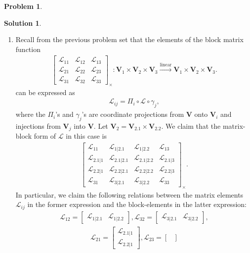 \documentclass{book}
\theoremstyle{definition}
\newtheorem*{prob*}{Problem}
\newtheorem*{sln*}{Solution}
\newcommand{\V}{\mathbf{V}}
\newcommand{\lag}{\mathcal{L}}
\newcommand{\lin}{\overset{\text{linear}}{\longrightarrow}}
\begin{document}
\begin{prob*}
\begin{sln*}
	$\,$
	\begin{enumerate}
		\item Recall from the previous problem set that the elements of the block matrix function 
		\begin{align*}
		\begin{bmatrix}
		\lag_{11} & \lag_{12} & \lag_{13}\\
		\lag_{21} & \lag_{22} & \lag_{23}\\
		\lag_{31} & \lag_{32} & \lag_{33}
		\end{bmatrix}_\times : \V_1\times \V_2 \times \V_3 \lin \V_1\times \V_2\times \V_3.
		\end{align*}
		can be expressed as
		\begin{align*}
		\lag_{ij} = \Pi_i \circ \lag \circ \gamma_j,
		\end{align*}
		where the $\Pi_i$'s and $\gamma_j$'s are coordinate projections from $\V$ onto $\V_i$ and injections from $\V_j$ into $\V$. Let $\V_2 = \V_{2.1} \times \V_{2.2}$. We claim that the matrix-block form of $\lag$ in this case is
		\begin{align*}
		\begin{bmatrix}
		\lag_{11} & \lag_{1|2.1} & \lag_{1|2.2} & \lag_{13}\\
		\lag_{2.1|1} & \lag_{2.1|2.1} & \lag_{2.1|2.2} & \lag_{2.1|3}\\
		\lag_{2.2|1} & \lag_{2.2|2.1} & \lag_{2.2|2.2} & \lag_{2.2|3}\\
		\lag_{31} & \lag_{3|2.1} & \lag_{3|2.2} & \lag_{33}
		\end{bmatrix}_\times.
		\end{align*}
		In particular, we claim the following relations between the matrix elements $\lag_{ij}$ in the former expression and the block-elements in the latter expression: 
		\begin{align*}
		\lag_{12} = \begin{bmatrix}
		\lag_{1|2.1}&\lag_{1|2.2}
		\end{bmatrix}, \lag_{32} = \begin{bmatrix}
		\lag_{3|2.1}&\lag_{3|2.2}
		\end{bmatrix}, 
		\end{align*}
		\begin{align*}
		\lag_{21} = \begin{bmatrix}
		\lag_{2.1|1}\\ \lag_{2.2|1}
		\end{bmatrix}, \lag_{23} = \begin{bmatrix}

\end{bmatrix}
\end{align*}
\end{enumerate}
\end{sln*}
\end{prob*}
\end{document}
